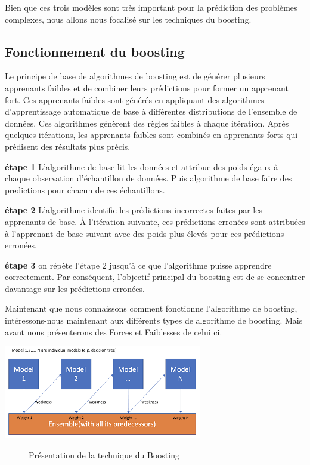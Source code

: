 \documentclass[french,a4paper,12pt]{article}
\begin{document}
\quad Bien que ces trois modèles sont très important pour la prédiction des problèmes complexes, nous allons nous focalisé sur les techniques du boosting.


 

\subsection{Fonctionnement du boosting}
\quad Le principe de base de algorithmes de boosting est de générer plusieurs apprenants faibles et de combiner leurs prédictions pour former un apprenant fort. Ces apprenants faibles sont générés en appliquant des algorithmes d'apprentissage automatique de base à différentes distributions de l'ensemble de données.\citep{educa} Ces algorithmes génèrent des règles faibles à chaque itération. Après quelques itérations, les apprenants faibles sont combinés en apprenants forts qui prédisent des résultats plus précis.



\textbf{étape 1}
 \quad L'algorithme de base lit les données et attribue des poids égaux à chaque observation d'échantillon de données. Puis algorithme de base faire des predictions pour chacun de ces échantillons.
 
 \textbf{étape 2}
 \quad L’algorithme identifie les prédictions incorrectes faites par les apprenants de base. À l'itération suivante, ces prédictions erronées sont attribuées à l'apprenant de base suivant avec des poids plus élevés pour ces prédictions erronées.

 
 \textbf{étape 3}
\quad on répète l'étape 2 jusqu'à ce que l'algorithme puisse apprendre correctement.
Par conséquent, l'objectif principal du boosting est de se concentrer davantage sur les prédictions erronées.

\quad Maintenant que nous connaissons comment fonctionne l’algorithme de boosting, intéressons-nous maintenant aux différents types de algorithme de boosting. Mais avant nous présenterons des Forces  et Faiblesses de celui ci.



 \begin{center}
\includegraphics[scale=1]{boosting definition.png}
\begin{figure}[h]
\caption{Présentation de la technique du Boosting}
\end{figure}
\end{center}
\end{document}
